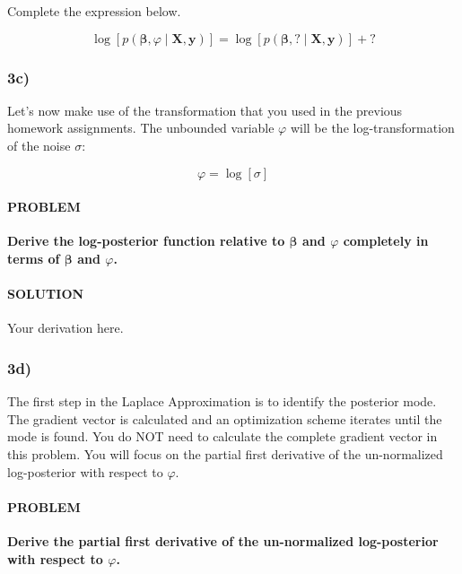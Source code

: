 \documentclass[
]{article}
\begin{document}
Complete the expression below.

\[ 
\log \left[p\left(\boldsymbol{\beta},\varphi \mid \mathbf{X}, \mathbf{y}\right)\right] = \log \left[p\left(\boldsymbol{\beta}, ? \mid \mathbf{X}, \mathbf{y}\right)\right] + ?
\]

\hypertarget{c-2}{%
\subsubsection{3c)}\label{c-2}}

Let's now make use of the transformation that you used in the previous
homework assignments. The unbounded variable \(\varphi\) will be the
log-transformation of the noise \(\sigma\):

\[ 
\varphi = \log\left[\sigma\right]
\]

\hypertarget{problem-14}{%
\paragraph{PROBLEM}\label{problem-14}}

\textbf{Derive the log-posterior function relative to
\(\boldsymbol{\beta}\) and \(\varphi\) completely in terms of
\(\boldsymbol{\beta}\) and \(\varphi\).}

\hypertarget{solution-14}{%
\paragraph{SOLUTION}\label{solution-14}}

Your derivation here.

\hypertarget{d-2}{%
\subsubsection{3d)}\label{d-2}}

The first step in the Laplace Approximation is to identify the posterior
mode. The gradient vector is calculated and an optimization scheme
iterates until the mode is found. You do NOT need to calculate the
complete gradient vector in this problem. You will focus on the partial
first derivative of the un-normalized log-posterior with respect to
\(\varphi\).

\hypertarget{problem-15}{%
\paragraph{PROBLEM}\label{problem-15}}

\textbf{Derive the partial first derivative of the un-normalized
log-posterior with respect to \(\varphi\).}
\end{document}
